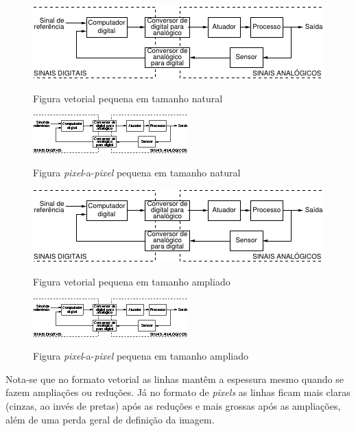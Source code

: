 \begin{figure}[htbp!] \begin{center}
\includegraphics{textuais/04-problema/figuras/smallvetorial}
\caption{Figura vetorial pequena em tamanho natural}
\label{Fig:smallvetorial}
\vspace{6mm}
\includegraphics{textuais/04-problema/figuras/smallbitmap}
\caption{Figura \emph{pixel}-a-\emph{pixel} pequena em tamanho natural}
\label{Fig:smallbitmap}
\vspace{6mm}
\includegraphics[width=\linewidth]{textuais/04-problema/figuras/smallvetorial}
\caption{Figura vetorial pequena em tamanho ampliado}
\label{Fig:smallvetorialampliada}
\vspace{6mm}
\includegraphics[width=\linewidth]{textuais/04-problema/figuras/smallbitmap}
\caption{Figura \emph{pixel}-a-\emph{pixel} pequena em tamanho ampliado}
\label{Fig:smallbitmapampliada}
\end{center} \end{figure}

Nota-se que no formato vetorial as
linhas mantêm a espessura mesmo quando se fazem
ampliações ou reduções. Já no formato de \emph{pixels}
as linhas ficam mais claras (cinzas, ao invés de pretas) após as
reduções e mais grossas após as ampliações, além de uma perda geral
de definição da imagem.

